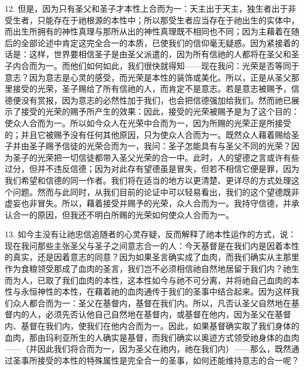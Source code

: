12. 但是，因为只有圣父和圣子才本性上合而为一：天主出于天主，独生者出于非受生者，只能存在于祂根源的本性中；所以那受生者应当存在于祂出生的实体中，而出生所拥有的神性真理与那所从出的神性真理既不相同也不同；因为主藉着在随后的全部论述中肯定这完全合一的本质，已使我们的信仰毫无疑惑。因为紧接着的话是：这样，世界要相信圣子是由圣父派遣的，因为所有信祂的人都将在圣父和圣子内合而为一。而他们如何如此，我们很快就得知——现在我问：光荣是否等同于意志？因为意志是心灵的感受，而光荣是本性的装饰或美化。所以，正是从圣父那里接受的光荣，圣子赐给了所有信祂的人，而肯定不是意志。若是意志被赐予，信德便没有赏报，因为意志的必然性加于我们，也会把信德强加给我们。然而祂已展示了接受的光荣的赐予所产生的效果：因此，接受的光荣被赐予是为了这个目的：使众人合而为一。所以如今众人在光荣中合而为一，因为所赐的光荣正是所接受的；并且它被赐予没有任何其他原因，只为使众人合而为一。既然众人藉着赐给圣子并由圣子赐予信徒的光荣合而为一，我问：圣子怎能具有与圣父不同的光荣？因为圣子的光荣把一切信徒都带入圣父光荣的合一中。此时，人的望德之言或许有些过分，但并不违反信德；因为对此存有望德虽是冒失，但若不相信它便是罪，因为我们希望和信德的同一作者。我们将在适当的地方以更清楚、更详尽的方式处理这个问题。然而与此同时，从我们目前的论证中可以轻易看出，我们的这个望德既非虚妄也非冒失。所以，藉着接受并赐予的光荣，众人合而为一。我持守信德，并承认合一的原因，但我还不明白所赐的光荣如何使众人合而为一。\par

13. 如今主没有让祂忠信追随者的心灵存疑，反而解释了祂本性运作的方式，说：现在我问那些主张圣父与圣子之间意志合一的人：今天基督是在我们内是因着本性的真实，还是因着意志的同意？因为如果圣言确实成了血肉，而我们确实从主那里作为食粮领受那成了血肉的圣言，我们岂不必须相信祂自然地居留于我们内？祂生而为人，已取了我们血肉的本性，这本性如今与祂不可分离，并将祂自己血肉的本性与永恒神性的本性，在藉着祂的血肉通传于我们的圣事中结合起来。因为这样我们众人都合而为一：圣父在基督内，基督在我们内。所以，凡否认圣父自然地在基督内的人，必须先否认他自己自然地在基督内，或基督在他内，因为圣父在基督内、基督在我们内，使我们在他内合而为一。因此，如果基督确实取了我们身体的血肉，那由玛利亚所生的人确实是基督，而我们确实以奥迹方式领受祂身体的血肉——（并因此我们将合而为一，因为圣父在祂内，祂在我们内）——那么，既然通过圣事所接受的本性的特殊属性是完全合一的圣事，如何还能维持意志的合一呢？\par

